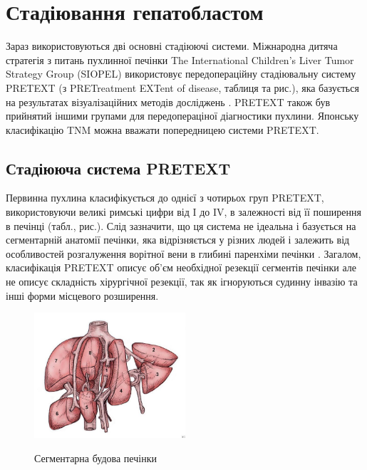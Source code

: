 \section{Стадіювання гепатобластом}
Зараз використовуються дві основні стадіюючі системи. Міжнародна дитяча стратегія з питань пухлинної печінки The International Children’s Liver Tumor Strategy Group (SIOPEL) використовує передопераційну стадіювальну систему PRETEXT (з PRETreatment EXTent of disease, таблиця  та рис.), яка базується на результатах візуалізаційних методів досліджень \cite{pmid22702740}. PRETEXT також був прийнятий іншими групами для передопераціної діагностики пухлини. Японську класифікацію TNM \cite{pmid22760493} можна вважати попередницею системи PRETEXT.

\subsection{Стадіююча система PRETEXT}
Первинна пухлина класифікується до однієї з чотирьох груп PRETEXT, використовуючи великі римські цифри від I до IV, в залежності від її поширення в печінці (табл., рис.). Слід зазначити, що ця система не ідеальна і базується на сегментарній анатомії печінки, яка відрізняється у різних людей і залежить від особливостей розгалуження ворітної вени в глибині паренхіми печінки \cite{pmid22760520}. Загалом, класифікація PRETEXT описує об’єм необхідної резекції сегментів печінки але не описує складність хірургічної резекції, так як ігноруються судинну інвазію та інші форми місцевого розширення.

\begin{figure}[h]
\centering
\includegraphics[width=0.5\textwidth]{Illustrations/segment.jpg}
\label{fig:segment} %
\caption{Сегментарна будова печінки}
\end{figure}

